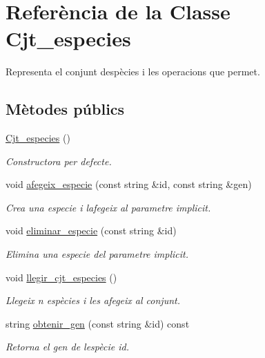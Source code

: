 \hypertarget{class_cjt__especies}{}\section{Referència de la Classe Cjt\+\_\+especies}
\label{class_cjt__especies}


Representa el conjunt d\textquotesingle{}espècies i les operacions que permet.  


\subsection*{Mètodes públics}
\begin{DoxyCompactItemize}
\item 
\hyperlink{class_cjt__especies_ab297567c73ccd8caefbd8760d90294a1}{Cjt\+\_\+especies} ()
\begin{DoxyCompactList}\small\item\em Constructora per defecte. \end{DoxyCompactList}\item 
void \hyperlink{class_cjt__especies_a542ea997b387b5bac131ba7bcb23aec3}{afegeix\+\_\+especie} (const string \&id, const string \&gen)
\begin{DoxyCompactList}\small\item\em Crea una especie i l\textquotesingle{}afegeix al parametre implicit. \end{DoxyCompactList}\item 
void \hyperlink{class_cjt__especies_a6de3583aff6835d743fc9493c7b38576}{eliminar\+\_\+especie} (const string \&id)
\begin{DoxyCompactList}\small\item\em Elimina una especie del parametre implicit. \end{DoxyCompactList}\item 
void \hyperlink{class_cjt__especies_a12bd759f16126d0e34b06ecf15575456}{llegir\+\_\+cjt\+\_\+especies} ()
\begin{DoxyCompactList}\small\item\em Llegeix n espècies i les afegeix al conjunt. \end{DoxyCompactList}\item 
string \hyperlink{class_cjt__especies_ae6c9a86512b2ed7686741459167b68c9}{obtenir\+\_\+gen} (const string \&id) const
\begin{DoxyCompactList}\small\item\em Retorna el gen de l\textquotesingle{}espècie id. \end{DoxyCompactList}\item 

\end{DoxyCompactItemize}
